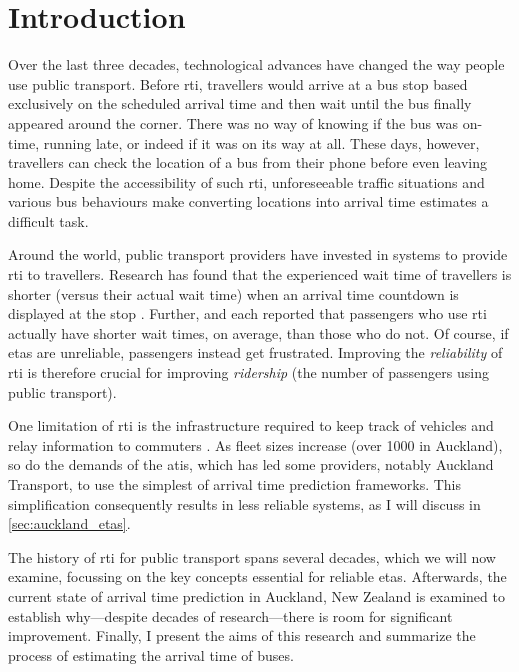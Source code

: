 \glsresetall

\chapter{Introduction}
\label{cha:intro}


Over the last three decades, technological advances have changed the way people use public transport. Before \gls{rti}, travellers would arrive at a bus stop based exclusively on the scheduled arrival time and then wait until the bus finally appeared around the corner. There was no way of knowing if the bus was on-time, running late, or indeed if it was on its way at all. These days, however, travellers can check the location of a bus from their phone before even leaving home. Despite the accessibility of such \gls{rti}, unforeseeable traffic situations and various bus behaviours make
converting locations into arrival time estimates a difficult task.


Around the world, public transport providers have invested in systems to provide \gls{rti} to travellers. Research has found that the experienced wait time of travellers is shorter (versus their actual wait time) when an arrival time countdown is displayed at the stop \citep{TCRP_2003}. Further, \citet{Cats_2015} and \citet{Lu_2017} each reported that passengers who use \gls{rti} actually have shorter wait times, on average, than those who do not. Of course, if \glspl{eta} are unreliable, passengers instead get frustrated. Improving the \emph{reliability} of \gls{rti} is therefore crucial for improving \emph{ridership} (the number of passengers using public transport).


One limitation of \gls{rti} is the infrastructure required to keep track of vehicles and relay information to commuters \cite{TCRP_2003b}. As fleet sizes increase (over 1000 in Auckland), so do the demands of the \gls{atis}, which has led some providers, notably Auckland Transport, to use the simplest of arrival time prediction frameworks. This simplification consequently results in less reliable systems, as I will discuss in \cref{sec:auckland_etas}.


The history of \gls{rti} for public transport spans several decades, which we will now examine, focussing on the key concepts essential for reliable \glspl{eta}. Afterwards, the current state of arrival time prediction in Auckland, New Zealand is examined to establish why---despite decades of research---there is room for significant improvement. Finally, I present the aims of this research and summarize the process of estimating the arrival time of buses.


